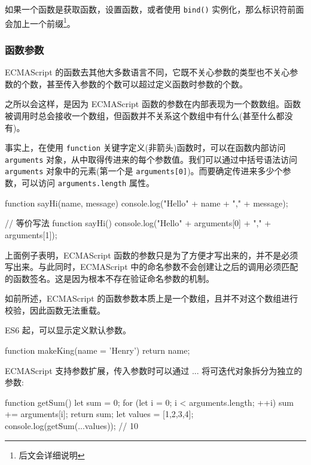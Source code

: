 如果一个函数是获取函数，设置函数，或者使用 \texttt{bind()} 实例化，那么标识符前面会加上一个前缀\footnote{后文会详细说明}。

\subsubsection*{函数参数}

ECMAScript 的函数去其他大多数语言不同，它既不关心参数的类型也不关心参数的个数，甚至传入参数的个数可以超过定义函数时参数的个数。

之所以会这样，是因为 ECMAScript 函数的参数在内部表现为一个数数组。函数被调用时总会接收一个数组，但函数并不关系这个数组中有什么(甚至什么都没有)。

事实上，在使用 \texttt{function} 关键字定义(非箭头)函数时，可以在函数内部访问 \texttt{arguments} 对象，从中取得传进来的每个参数值。我们可以通过中括号语法访问 \texttt{arguments} 对象中的元素(第一个是 \texttt{arguments[0]})。而要确定传进来多少个参数，可以访问 \texttt{arguments.length} 属性。

\begin{JavaScript}
function sayHi(name, message) {
    console.log("Hello" + name + "," + message);
    }
    
// 等价写法
function sayHi() {
    console.log("Hello" + arguments[0] + "," + arguments[1]);
}
\end{JavaScript}

上面例子表明，ECMAScript 函数的参数只是为了方便才写出来的，并不是必须写出来。与此同时，ECMAScript 中的命名参数不会创建让之后的调用必须匹配的函数签名。这是因为根本不存在验证命名参数的机制。

如前所述，ECMAScript 的函数参数本质上是一个数组，且并不对这个数组进行校验，因此函数无法重载。

ES6 起，可以显示定义默认参数。

\begin{JavaScript}
function makeKing(name = 'Henry') {   
    return name;  
} 
\end{JavaScript}

ECMAScript 支持参数扩展，传入参数时可以通过 ... 将可迭代对象拆分为独立的参数:

\begin{JavaScript}
function getSum() {   
    let sum = 0;   
    for (let i = 0; i < arguments.length; ++i) {     
        sum += arguments[i];   
    }   
    return sum; 
} 
let values = [1,2,3,4];
console.log(getSum(...values)); // 10
\end{JavaScript}

